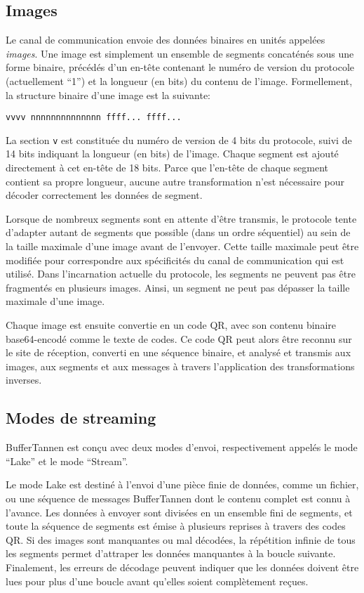 \subsection{Images}
\setcounter{paragraph}{0}

Le canal de communication envoie des données binaires en unités appelées \emph{images}. Une image est simplement un ensemble de segments concaténés sous une forme binaire, précédés d'un en-tête contenant le numéro de version du protocole (actuellement ``1'') et la longueur (en bits) du contenu de l'image. Formellement, la structure binaire d'une image est la suivante:

\begin{verbatim}
vvvv nnnnnnnnnnnnnn ffff... ffff...
\end{verbatim}

La section \verb+v+ est constituée du numéro de version de 4 bits du protocole, suivi de 14 bits indiquant la longueur (en bits) de l'image. Chaque segment est ajouté directement à cet en-tête de 18 bits. Parce que l'en-tête de chaque segment contient sa propre longueur, aucune autre transformation n'est nécessaire pour décoder correctement les données de segment.

Lorsque de nombreux segments sont en attente d'être transmis, le protocole tente d'adapter autant de segments que possible (dans un ordre séquentiel) au sein de la taille maximale d'une image avant de l'envoyer. Cette taille maximale peut être modifiée pour correspondre aux spécificités du canal de communication qui est utilisé. Dans l'incarnation actuelle du protocole, les segments ne peuvent pas être fragmentés en plusieurs images. Ainsi, un segment ne peut pas dépasser la taille maximale d'une image.

Chaque image est ensuite convertie en un code QR, avec son contenu binaire base64-encodé comme le texte de codes. Ce code QR peut alors être reconnu sur le site de réception, converti en une séquence binaire, et analysé et transmis aux images, aux segments et aux messages à travers l'application des transformations inverses.

\subsection{Modes de streaming}
\setcounter{paragraph}{0}

BufferTannen est conçu avec deux modes d'envoi, respectivement appelés le mode ``Lake'' et le mode ``Stream''.

Le mode Lake est destiné à l'envoi d'une pièce finie de données, comme un fichier, ou une séquence de messages BufferTannen dont le contenu complet est connu à l'avance. Les données à envoyer sont divisées en un ensemble fini de segments, et toute la séquence de segments est émise à plusieurs reprises à travers des codes QR. Si des images sont manquantes ou mal décodées, la répétition infinie de tous les segments permet d'attraper les données manquantes à la boucle suivante. Finalement, les erreurs de décodage peuvent indiquer que les données doivent être lues pour plus d'une boucle avant qu'elles soient complètement reçues.

